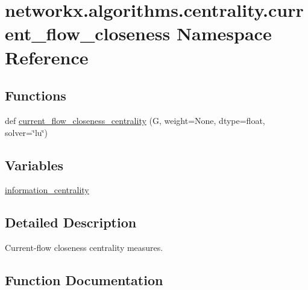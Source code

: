 \hypertarget{namespacenetworkx_1_1algorithms_1_1centrality_1_1current__flow__closeness}{}\section{networkx.\+algorithms.\+centrality.\+current\+\_\+flow\+\_\+closeness Namespace Reference}
\label{namespacenetworkx_1_1algorithms_1_1centrality_1_1current__flow__closeness}
\subsection*{Functions}
\begin{DoxyCompactItemize}
\item 
def \hyperlink{namespacenetworkx_1_1algorithms_1_1centrality_1_1current__flow__closeness_ae0edeb85229fd0262cbd46d1cef3c7c5}{current\+\_\+flow\+\_\+closeness\+\_\+centrality} (G, weight=None, dtype=float, solver=\char`\"{}lu\char`\"{})
\end{DoxyCompactItemize}
\subsection*{Variables}
\begin{DoxyCompactItemize}
\item 
\hyperlink{namespacenetworkx_1_1algorithms_1_1centrality_1_1current__flow__closeness_adeb70f2d9eaf0db2eb11d024dfc2914b}{information\+\_\+centrality}
\end{DoxyCompactItemize}


\subsection{Detailed Description}
\begin{DoxyVerb}Current-flow closeness centrality measures.\end{DoxyVerb}
 

\subsection{Function Documentation}
\mbox{\label{namespacenetworkx_1_1algorithms_1_1centrality_1_1current__flow__closeness_ae0edeb85229fd0262cbd46d1cef3c7c5}} 
